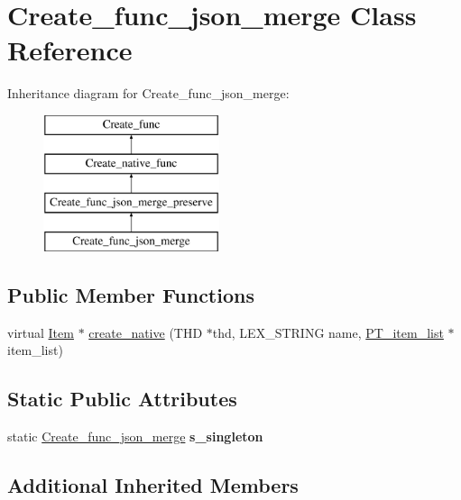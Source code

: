 \hypertarget{classCreate__func__json__merge}{}\section{Create\+\_\+func\+\_\+json\+\_\+merge Class Reference}
\label{classCreate__func__json__merge}
Inheritance diagram for Create\+\_\+func\+\_\+json\+\_\+merge\+:\begin{figure}[H]
\begin{center}
\leavevmode
\includegraphics[height=4.000000cm]{classCreate__func__json__merge}
\end{center}
\end{figure}
\subsection*{Public Member Functions}
\begin{DoxyCompactItemize}
\item 
virtual \mbox{\hyperlink{classItem}{Item}} $\ast$ \mbox{\hyperlink{classCreate__func__json__merge_a071ffb8f513c621ee895332c462543b1}{create\+\_\+native}} (T\+HD $\ast$thd, L\+E\+X\+\_\+\+S\+T\+R\+I\+NG name, \mbox{\hyperlink{classPT__item__list}{P\+T\+\_\+item\+\_\+list}} $\ast$item\+\_\+list)
\end{DoxyCompactItemize}
\subsection*{Static Public Attributes}
\begin{DoxyCompactItemize}
\item 
\mbox{\label{classCreate__func__json__merge_a49d03d34bfcc9f19eec9bf61f6b8dfa1}} 
static \mbox{\hyperlink{classCreate__func__json__merge}{Create\+\_\+func\+\_\+json\+\_\+merge}} {\bfseries s\+\_\+singleton}
\end{DoxyCompactItemize}
\subsection*{Additional Inherited Members}


